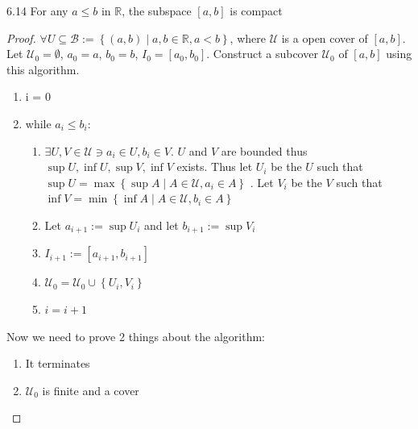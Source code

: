 \documentclass{article}
\newcommand*{\B}{\mathcal{B}}
\newcommand{\R}{\mathbb{R}}
\begin{document}
\begin{claim}{6.14}\label{Claim 6.14.}
    For any $a \leq b$ in $\R$, the subspace $[a, b]$ is compact   
\end{claim}
\begin{proof}
    $\forall U \subseteq \B := \left\{ (a, b) \mid a, b \in \R, a < b \right\} $, where $\mathcal{U}$ is a open cover of $[a, b]$. Let $\mathcal{U}_0 = \emptyset$, $a_0 = a$, $b_0 = b$, $I_0 = [a_0, b_0]$. Construct a subcover $\mathcal{U}_0$ of $[a, b]$ using this algorithm.
    
    \begin{enumerate}
        \item i = 0
        \item while $a_i \leq b_i$: 
        
        \begin{enumerate}
            \item $\exists U, V \in \mathcal{U} \ni a_i \in U, b_i \in V$. $U$ and $V$ are bounded thus $\sup U, \inf U, \sup V, \inf V$ exists. Thus let $U_i$ be the $U$ such that $\sup U = \max\left\{ \sup A \mid A \in \mathcal{U}, a_i \in A \right\}$ . Let $V_i$ be the $V$ such that $\inf V = \min\left\{ \inf A \mid A \in \mathcal{U}, b_i \in A \right\}$
            \item Let $a_{i + 1} := \sup U_i$ and let $b_{i + 1} := \sup V_i$
            \item $I_{i + 1} := [a_{i + 1}, b_{i + 1}]$
            \item $\mathcal{U}_0 = \mathcal{U}_0 \cup \left\{ U_i, V_i \right\}$  
            \item $i = i + 1$   
        \end{enumerate}
    \end{enumerate}

    Now we need to prove 2 things about the algorithm: 

    \begin{enumerate}
        \item It terminates
        \item $\mathcal{U}_0$ is finite and a cover 
    \end{enumerate}


\end{proof}
\end{document}
